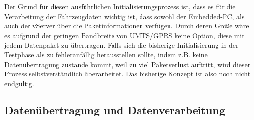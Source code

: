 \documentclass[fontsize = 12pt, paper = a4]{scrreprt}
\begin{document}
Der Grund für diesen ausführlichen Initialisierungsprozess ist, dass es für die Verarbeitung der Fahrzeugdaten wichtig ist, dass sowohl der Embedded-PC, als auch der vServer über die Paketinformationen verfügen. Durch deren Größe wäre es aufgrund der geringen Bandbreite von UMTS/GPRS keine Option, diese mit jedem Datenpaket zu übertragen. Falls sich die bisherige Initialisierung in der Testphase als zu fehleranfällig herausstellen sollte, indem z.B. keine Datenübertragung zustande kommt, weil zu viel Paketverlust auftritt, wird dieser Prozess selbstverständlich überarbeitet. Das bisherige Konzept ist also noch nicht endgültig.

\subsection{Datenübertragung und Datenverarbeitung}
\end{document}
